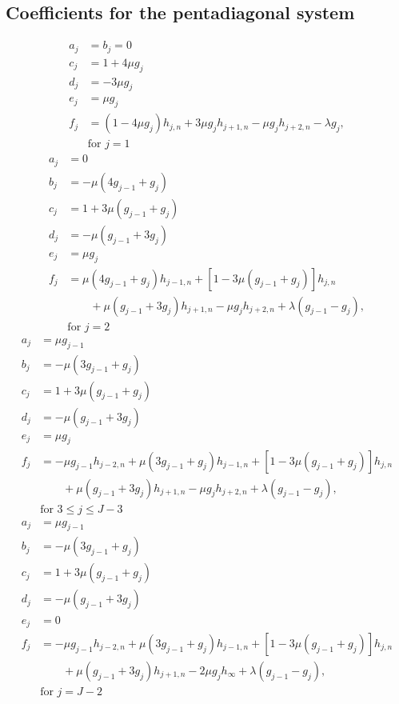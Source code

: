 \documentclass[12pt]{article}
\numberwithin{equation}{section}
\begin{document}
\subsection{Coefficients for the pentadiagonal system}
\begin{align}
	a_j &=b_j =  0
	\\
	c_j &= 1 +  4\mu  g_j
	\\
	d_j &=- 3\mu  g_{j}
	\\
	e_j &=\mu  g_{j}
	\\
	f_j &=
	(1 - 4 \mu g_j) h_{j,n}
	+ 3\mu g_jh_{j+1,n}
	- \mu g_j h_{j+2,n}
	- \lambda  g_{j},
	\\ \nonumber
	&\text{for } j= 1
\end{align}
\begin{align}
	a_j &= 0
	\\
	b_j &= -  \mu  (4g_{j-1} + g_{j}) 
	\\
	c_j &= 1 +  3\mu  ( g_{j-1}+ g_j )
	\\
	d_j &=- \mu  (g_{j-1} + 3 g_{j})
	\\
	e_j &=\mu  g_{j}
	\\
	f_j &=
	\mu (4 g_{j-1}+ g_j ) h_{j-1,n}
	+\left[1 - 3 \mu (g_{j-1} + g_j) \right]h_{j,n}
	\nonumber \\ &\qquad
	+ \mu ( g_{j-1}+ 3g_j )h_{j+1,n}
	- \mu g_j h_{j+2,n}
	+ \lambda(g_{j-1} - g_{j}),
	\\ \nonumber
	&\text{for } j=2
\end{align}
\begin{align}
	a_j &= \mu g_{j-1}
	\\
	b_j &= -  \mu  (3g_{j-1} + g_{j}) 
	\\
	c_j &= 1 +  3\mu  ( g_{j-1}+ g_j )
	\\
	d_j &=- \mu  (g_{j-1} + 3 g_{j})
	\\
	e_j &=\mu  g_{j}
	\\
	f_j &=-  \mu  g_{j-1} h_{j-2,n}
	+ \mu (3 g_{j-1}+ g_j ) h_{j-1,n}
	+\left[1 - 3 \mu (g_{j-1} + g_j) \right]h_{j,n}
	\nonumber \\ &\qquad
	+ \mu ( g_{j-1}+ 3g_j )h_{j+1,n}
	- \mu g_j h_{j+2,n}
	+ \lambda(g_{j-1} - g_{j}),
	\\ \nonumber
	&\text{for } 3 \le j \le J-3
\end{align}
\begin{align}
	a_j &= \mu g_{j-1}
	\\
	b_j &= -  \mu  (3g_{j-1} + g_{j}) 
	\\
	c_j &= 1 +  3\mu  ( g_{j-1}+ g_j )
	\\
	d_j &=- \mu  (g_{j-1} + 3 g_{j})
	\\
	e_j &=0
	\\
	f_j &=-  \mu  g_{j-1} h_{j-2,n}
	+ \mu (3 g_{j-1}+ g_j ) h_{j-1,n}
	+\left[1 - 3 \mu (g_{j-1} + g_j) \right]h_{j,n}
	\nonumber \\ &\qquad
	+ \mu ( g_{j-1}+ 3g_j )h_{j+1,n}
	- 2\mu g_j h_\infty
	+ \lambda(g_{j-1} - g_{j}),
	\\ \nonumber
	&\text{for } j = J-2
\end{align}
\end{document}
